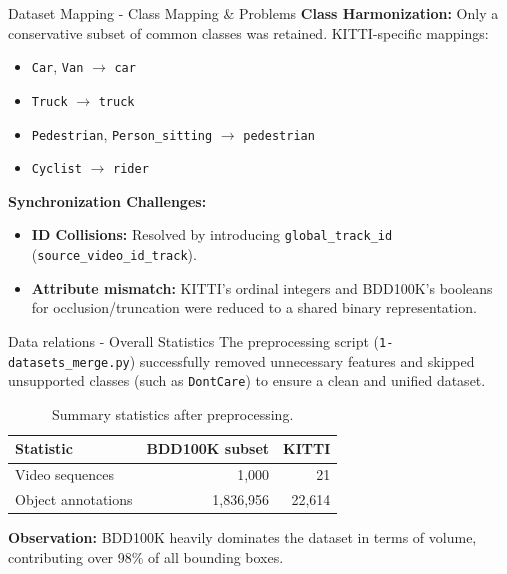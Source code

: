 \documentclass{beamer}
\begin{document}
\begin{frame}{Dataset Mapping - Class Mapping \& Problems}
    \textbf{Class Harmonization:}
    Only a conservative subset of common classes was retained. KITTI-specific mappings:
    \begin{itemize}
        \item \texttt{Car}, \texttt{Van} $\rightarrow$ \texttt{car}
        \item \texttt{Truck} $\rightarrow$ \texttt{truck}
        \item \texttt{Pedestrian}, \texttt{Person\_sitting} $\rightarrow$ \texttt{pedestrian}
        \item \texttt{Cyclist} $\rightarrow$ \texttt{rider}
    \end{itemize}
    \vspace{0.2cm}
    \textbf{Synchronization Challenges:}
    \begin{itemize}
        \item \textbf{ID Collisions:} Resolved by introducing \texttt{global\_track\_id} (\texttt{source\_video\_id\_track}).
        \item \textbf{Attribute mismatch:} KITTI's ordinal integers and BDD100K's booleans for occlusion/truncation were reduced to a shared binary representation.
    \end{itemize}
\end{frame}

\begin{frame}{Data relations - Overall Statistics}
    The preprocessing script (\texttt{1-datasets\_merge.py}) successfully removed unnecessary features and skipped unsupported classes (such as \texttt{DontCare}) to ensure a clean and unified dataset.
    
    \vspace{0.3cm}
    \begin{table}
        \centering
        \begin{tabular}{lrr}
        \toprule
        \textbf{Statistic} & \textbf{BDD100K subset} & \textbf{KITTI} \\
        \midrule
        Video sequences   & 1,000  & 21 \\
        Object annotations & 1,836,956 & 22,614 \\
        \bottomrule
        \end{tabular}
        \caption{Summary statistics after preprocessing.}
    \end{table}
    \vspace{0.2cm}
    \textbf{Observation:} BDD100K heavily dominates the dataset in terms of volume, contributing over 98\% of all bounding boxes.
\end{frame}
\end{document}
